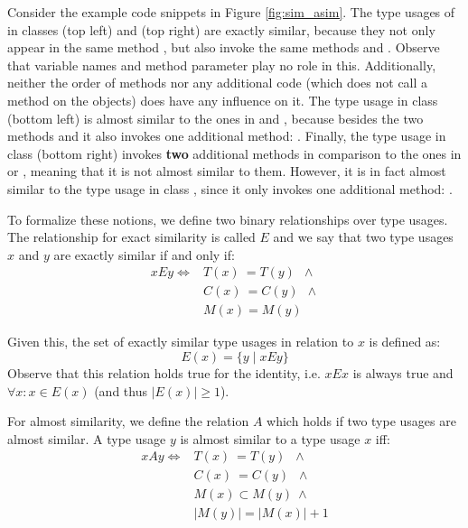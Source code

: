 Consider the example code snippets in Figure \ref{fig:sim_asim}.
The type usages of  in classes  (top left) and  (top right) are exactly similar, because they not only appear in the same method , but also invoke the same methods  and .
Observe that variable names and method parameter play no role in this.
Additionally, neither the order of methods nor any additional code (which does not call a method on the  objects) does have any influence on it.
The type usage in class  (bottom left) is almost similar to the ones in  and , because besides the two methods  and  it also invokes one additional method: .
Finally, the type usage in class  (bottom right) invokes \textbf{two} additional methods in comparison to the ones in  or , meaning that it is not almost similar to them.
However, it is in fact almost similar to the type usage in class , since it only invokes one additional method: .

To formalize these notions, we define two binary relationships over type usages.
The relationship for exact similarity is called $E$ and we say that two type usages $x$ and $y$ are exactly similar if and only if:
\begin{align*}
xEy \iff & T(x) \: = T(y) \;\: \land \\
         & C(x) \: = C(y) \;\: \land \\
         & M(x) = M(y)
\end{align*}

Given this, the set of exactly similar type usages in relation to $x$ is defined as:
\begin{equation*}
E(x) = \{y \mid xEy \}
\end{equation*}
Observe that this relation holds true for the identity, i.e. $xEx$ is always true and $\forall x: x \in E(x)$ (and thus $|E(x)| \geq 1$).

For almost similarity, we define the relation $A$ which holds if two type usages are almost similar.
A type usage $y$ is almost similar to a type usage $x$ iff:
\begin{align*}
xAy \iff & T(x) \: = T(y) \;\; \land \\
         & C(x) \: = C(y) \;\; \land \\
         & M(x) \subset M(y) \: \land \\
         & |M(y)| = |M(x)| + 1
\end{align*}

